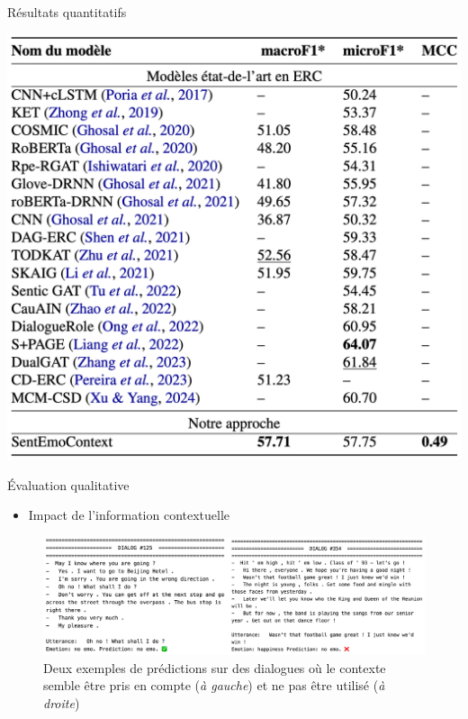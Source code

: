 \documentclass[11pt,aspectratio=169]{beamer}
\begin{document}
\begin{frame}{Résultats quantitatifs}
    \begin{minipage}{0.6\textwidth}
        \centering
        \includegraphics[scale=0.23]{results-2024.png}
    \end{minipage}%
    \begin{minipage}{0.4\textwidth}
        \centering
    \end{minipage}
\end{frame}

\begin{frame}{Évaluation qualitative}
    \begin{itemize}
        \item Impact de l'information contextuelle
    \end{itemize}
    \begin{figure}[h]
        \centering
        \includegraphics[width=\textwidth]{hsh.png}
        \caption{\centering Deux exemples de prédictions sur des dialogues où le contexte semble être pris en compte (\textsl{à gauche}) et ne pas être utilisé (\textsl{à droite})}
    \end{figure}
\end{frame}
\end{document}
